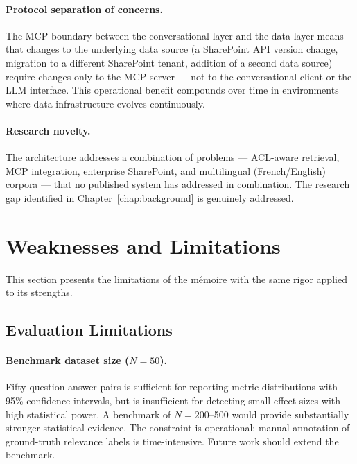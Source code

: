 \paragraph{Protocol separation of concerns.} The MCP boundary between the conversational layer and the data layer means that changes to the underlying data source (a SharePoint API version change, migration to a different SharePoint tenant, addition of a second data source) require changes only to the MCP server --- not to the conversational client or the LLM interface. This operational benefit compounds over time in environments where data infrastructure evolves continuously.

\paragraph{Research novelty.} The architecture addresses a combination of problems --- ACL-aware retrieval, MCP integration, enterprise SharePoint, and multilingual (French/English) corpora --- that no published system has addressed in combination. The research gap identified in Chapter~\ref{chap:background} is genuinely addressed.

\section{Weaknesses and Limitations}
\label{sec:disc-limitations}

This section presents the limitations of the mémoire with the same rigor applied to its strengths.

\subsection{Evaluation Limitations}

\paragraph{Benchmark dataset size ($N=50$).} Fifty question-answer pairs is sufficient for reporting metric distributions with 95\% confidence intervals, but is insufficient for detecting small effect sizes with high statistical power. A benchmark of $N=200$--500 would provide substantially stronger statistical evidence. The constraint is operational: manual annotation of ground-truth relevance labels is time-intensive. Future work should extend the benchmark.

